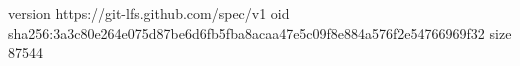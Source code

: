 version https://git-lfs.github.com/spec/v1
oid sha256:3a3c80e264e075d87be6d6fb5fba8acaa47e5c09f8e884a576f2e54766969f32
size 87544
